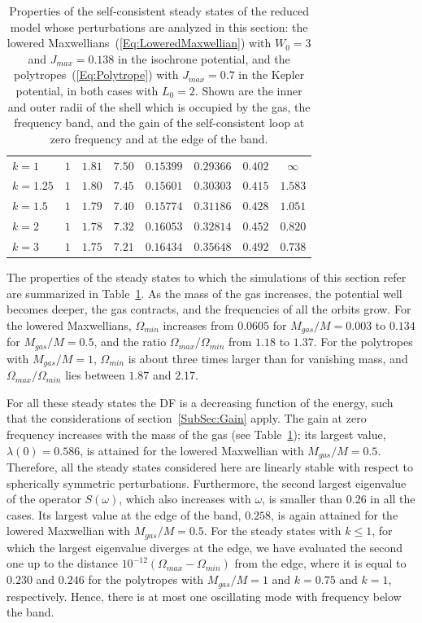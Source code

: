 \begin{table}[htp]
\begin{center}
\begin{tabular}{ll|cc|cc|cc}
\phantom{polytrope,} $k = 1$ & $1$ & $1.81$ & $7.50$ & $0.15399$ & $0.29366$ & $0.402$ & $\infty$ \\
\phantom{polytrope,} $k = 1.25$ & $1$ & $1.80$ & $7.45$ & $0.15601$ & $0.30303$ & $0.415$ & $1.583$ \\
\phantom{polytrope,} $k = 1.5$ & $1$ & $1.79$ & $7.40$ & $0.15774$ & $0.31186$ & $0.428$ & $1.051$ \\
\phantom{polytrope,} $k = 2$ & $1$ & $1.78$ & $7.32$ & $0.16053$ & $0.32814$ & $0.452$ & $0.820$ \\
\phantom{polytrope,} $k = 3$ & $1$ & $1.75$ & $7.21$ & $0.16434$ & $0.35648$ & $0.492$ & $0.738$ \\
\hline\hline
\end{tabular}
\end{center}
\caption{Properties of the self-consistent steady states of the reduced model whose perturbations are analyzed in this section: the lowered Maxwellians~(\ref{Eq:LoweredMaxwellian}) with $W_0 = 3$ and $J_{max} = 0.138$ in the isochrone potential, and the polytropes~(\ref{Eq:Polytrope}) with $J_{max} = 0.7$ in the Kepler potential, in both cases with $L_0 = 2$. Shown are the inner and outer radii of the shell which is occupied by the gas, the frequency band, and the gain of the self-consistent loop at zero frequency and at the edge of the band.}
\label{Tab:SteadyStates}
\end{table}

The properties of the steady states to which the simulations of this section refer are summarized in Table~\ref{Tab:SteadyStates}. As the mass of the gas increases, the potential well becomes deeper, the gas contracts, and the frequencies of all the orbits grow. For the lowered Maxwellians, $\Omega_{min}$ increases from $0.0605$ for $M_{gas}/M = 0.003$ to $0.134$ for $M_{gas}/M = 0.5$, and the ratio $\Omega_{max}/\Omega_{min}$ from $1.18$ to $1.37$. For the polytropes with $M_{gas}/M = 1$, $\Omega_{min}$ is about three times larger than for vanishing mass, and $\Omega_{max}/\Omega_{min}$ lies between $1.87$ and $2.17$.

For all these steady states the DF is a decreasing function of the energy, such that the considerations of section~\ref{SubSec:Gain} apply. The gain at zero frequency increases with the mass of the gas (see Table~\ref{Tab:SteadyStates}); its largest value, $\lambda(0) = 0.586$, is attained for the lowered Maxwellian with $M_{gas}/M = 0.5$. Therefore, all the steady states considered here are linearly stable with respect to spherically symmetric perturbations. Furthermore, the second largest eigenvalue of the operator $S(\omega)$, which also increases with $\omega$, is smaller than $0.26$ in all the cases. Its largest value at the edge of the band, $0.258$, is again attained for the lowered Maxwellian with $M_{gas}/M = 0.5$. For the steady states with $k\leq 1$, for which the largest eigenvalue diverges at the edge, we have evaluated the second one up to the distance $10^{-12}(\Omega_{max} - \Omega_{min})$ from the edge, where it is equal to $0.230$ and $0.246$ for the polytropes with $M_{gas}/M = 1$ and $k = 0.75$ and $k = 1$, respectively. Hence, there is at most one oscillating mode with frequency below the band.

